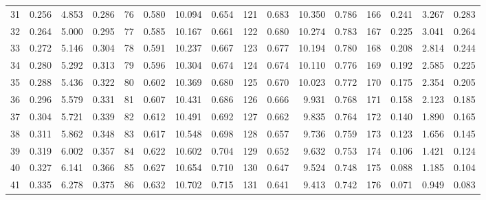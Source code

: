 \begin{table}[!h]
{\begin{tabular}{rrrr|rrrr|rrrr|rrrr}
 31 & \tiny{  0.256} &   4.853 & \tiny{  0.286} &  76 & \tiny{  0.580} &  10.094 & \tiny{  0.654} & 121 & \tiny{  0.683} &  10.350 & \tiny{  0.786} & 166 & \tiny{  0.241} &   3.267 & \tiny{  0.283}\\
 32 & \tiny{  0.264} &   5.000 & \tiny{  0.295} &  77 & \tiny{  0.585} &  10.167 & \tiny{  0.661} & 122 & \tiny{  0.680} &  10.274 & \tiny{  0.783} & 167 & \tiny{  0.225} &   3.041 & \tiny{  0.264}\\
 33 & \tiny{  0.272} &   5.146 & \tiny{  0.304} &  78 & \tiny{  0.591} &  10.237 & \tiny{  0.667} & 123 & \tiny{  0.677} &  10.194 & \tiny{  0.780} & 168 & \tiny{  0.208} &   2.814 & \tiny{  0.244}\\
 34 & \tiny{  0.280} &   5.292 & \tiny{  0.313} &  79 & \tiny{  0.596} &  10.304 & \tiny{  0.674} & 124 & \tiny{  0.674} &  10.110 & \tiny{  0.776} & 169 & \tiny{  0.192} &   2.585 & \tiny{  0.225}\\
 35 & \tiny{  0.288} &   5.436 & \tiny{  0.322} &  80 & \tiny{  0.602} &  10.369 & \tiny{  0.680} & 125 & \tiny{  0.670} &  10.023 & \tiny{  0.772} & 170 & \tiny{  0.175} &   2.354 & \tiny{  0.205}\\
 36 & \tiny{  0.296} &   5.579 & \tiny{  0.331} &  81 & \tiny{  0.607} &  10.431 & \tiny{  0.686} & 126 & \tiny{  0.666} &   9.931 & \tiny{  0.768} & 171 & \tiny{  0.158} &   2.123 & \tiny{  0.185}\\
 37 & \tiny{  0.304} &   5.721 & \tiny{  0.339} &  82 & \tiny{  0.612} &  10.491 & \tiny{  0.692} & 127 & \tiny{  0.662} &   9.835 & \tiny{  0.764} & 172 & \tiny{  0.140} &   1.890 & \tiny{  0.165}\\
 38 & \tiny{  0.311} &   5.862 & \tiny{  0.348} &  83 & \tiny{  0.617} &  10.548 & \tiny{  0.698} & 128 & \tiny{  0.657} &   9.736 & \tiny{  0.759} & 173 & \tiny{  0.123} &   1.656 & \tiny{  0.145}\\
 39 & \tiny{  0.319} &   6.002 & \tiny{  0.357} &  84 & \tiny{  0.622} &  10.602 & \tiny{  0.704} & 129 & \tiny{  0.652} &   9.632 & \tiny{  0.753} & 174 & \tiny{  0.106} &   1.421 & \tiny{  0.124}\\
 40 & \tiny{  0.327} &   6.141 & \tiny{  0.366} &  85 & \tiny{  0.627} &  10.654 & \tiny{  0.710} & 130 & \tiny{  0.647} &   9.524 & \tiny{  0.748} & 175 & \tiny{  0.088} &   1.185 & \tiny{  0.104}\\
 41 & \tiny{  0.335} &   6.278 & \tiny{  0.375} &  86 & \tiny{  0.632} &  10.702 & \tiny{  0.715} & 131 & \tiny{  0.641} &   9.413 & \tiny{  0.742} & 176 & \tiny{  0.071} &   0.949 & \tiny{  0.083}\\

\end{tabular}}
\end{table}
